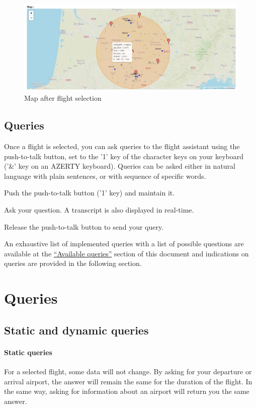 \documentclass[12pt,oneside,a4]{article}
\let\tempone\itemize
\let\temptwo\enditemize
\renewenvironment{itemize}{\tempone\addtolength{\itemsep}{-0.5\baselineskip}}{\temptwo}
\begin{document}
\begin{figure}[h!]
    \centering
    \includegraphics[width=.9\linewidth]{select_flight.jpg}
    \caption{Map after flight selection}
    \label{fig:select_flight}
\end{figure}


\subsection{Queries}
Once a flight is selected, you can ask queries to the flight assistant using the push-to-talk button, set to the '1' key of the character keys on your keyboard ('\&' key on an AZERTY keyboard). Queries can be asked either in natural language with plain sentences, or with sequence of specific words.

\begin{itemize}
    \item Push the push-to-talk button ('1' key) and maintain it.
    \item Ask your question. A transcript is also displayed in real-time.
    \item Release the push-to-talk button to send your query.
\end{itemize}

An exhaustive list of implemented queries with a list of possible questions are available at the \hyperref[sec:available-queries]{``Available queries''} section of this document
and indications on queries are provided in the following section.


\section{Queries}
\subsection{Static and dynamic queries}

\paragraph{Static queries}
For a selected flight, some data will not change.
By asking for your departure or arrival airport, the answer will remain the same for the duration of the flight.
In the same way, asking for information about an airport will return you the same answer.
\end{document}
